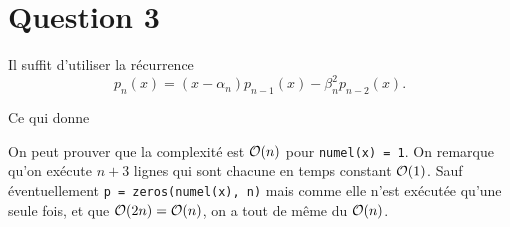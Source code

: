 \section*{Question 3}
Il suffit d'utiliser la récurrence
\[ p_n(x) = (x - \alpha_n)p_{n-1}(x) - \beta_n^2 p_{n-2}(x). \]

Ce qui donne


On peut prouver que la complexité est $\mathcal{O}(n)$ pour
\lstinline{numel(x) = 1}.
On remarque qu'on exécute $n+3$ lignes qui sont chacune en temps constant
$\mathcal{O}(1)$.
Sauf éventuellement \lstinline{p = zeros(numel(x), n)} mais comme elle
n'est exécutée qu'une seule fois, et que $\mathcal{O}(2n) = \mathcal{O}(n)$,
on a tout de même du $\mathcal{O}(n)$.
